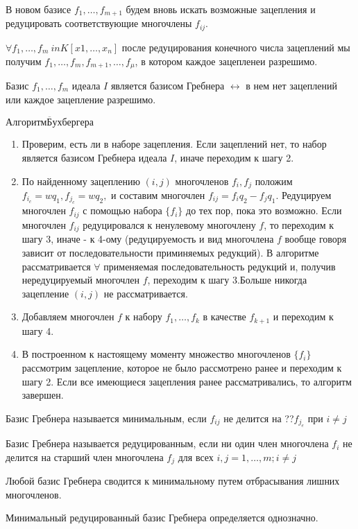 \documentclass[12pt]{article}
\begin{document}
 В новом базисе $f_1,\dots,f_{m+1}$ будем вновь искать возможные зацепления и редуцировать соответствующие многочлены $f_{ij}$.

\thr $\forall f_1,\dots,f_m \ in K[x1,\dots,x_n]$ после редуцирования конечного числа зацеплений мы получим $f_1,\dots,f_m,f_{m+1},\dots,f_\mu$, в котором каждое зацепленеи разрешимо.

\thr Базис $f_1,\dots,f_m$ идеала $I$ является базисом Гребнера $\leftrightarrow$ в нем нет зацеплений или каждое зацепление разрешимо.

$\overline{Алгоритм Бухбергера}$
\begin{enumerate}
	\item Проверим, есть ли в наборе зацепления. Если зацеплений нет, то набор является базисом Гребнера идеала $I$, иначе переходим к шагу 2.
	\item По найденному зацеплению $(i,j)$ многочленов $f_i,f_j$ положим $f_{i_c} = wq_1, f_{j_c} = wq_2,$ и составим многочлен $f_{ij} = f_iq_2 - f_jq_1$. Редуцируем многочлен $f_{ij}$ с помощью набора $\{f_i\}$ до тех пор, пока это возможно. Если многочлен $f_{ij}$ редуцировался к ненулевому многочлену $f$, то переходим к шагу 3, иначе - к 4-ому (редуцируемость и вид многочлена $f$ вообще говоря зависит от последовательности приминяемых редукций). В алгоритме рассматривается $\forall$ применяемая последовательность редукций и, получив нередуцируемый многочлен $f$, переходим к шагу 3.Больше никогда зацепление $(i,j)$ не рассматривается. 
	\item Добавляем многочлен $f$ к набору $f_1,\dots,f_k$ в качестве $f_{k+1}$ и переходим к шагу 4.
	\item В построенном к настоящему моменту множество многочленов $\{f_i\}$ рассмотрим зацепление, которое не было рассмотрено ранее и переходим к шагу 2. Если все имеющиеся зацепления ранее рассматривались, то алгоритм завершен.
\end{enumerate}

\opr Базис Гребнера называется минимальным, если $f_{ij}$ не делится на ??$f_{j_e}$ при $i \neq j$

\opr Базис Гребнера называется редуцированным, если ни один член многочлена $f_i$ не делится на старший член многочлена $f_j$ для всех $i,j = 1,\dots,m; i \neq j$

\note Любой базис Гребнера сводится к минимальному путем отбрасывания лишних многочленов.

\thr Минимальный редуцированный базис Гребнера определяется однозначно.
\end{document}
